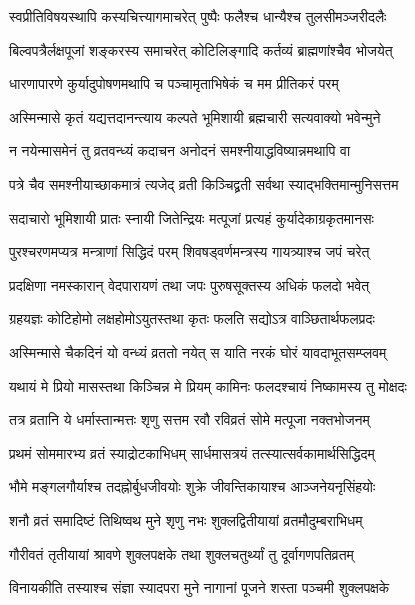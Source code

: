 \twolineshloka
{स्वप्रीतिविषयस्थापि कस्यचित्त्यागमाचरेत्}
{पुष्पैः फलैश्च धान्यैश्च तुलसीमञ्जरीदलैः} %

\twolineshloka
{बिल्वपत्रैर्लक्षपूजां शङ्करस्य समाचरेत्}
{कोटिलिङ्गादि कर्तव्यं ब्राह्मणांश्चैव भोजयेत्} %

\twolineshloka
{धारणापारणे कुर्यादुपोषणमथापि च}
{पञ्चामृताभिषेकं च मम प्रीतिकरं परम्} %

\twolineshloka
{अस्मिन्मासे कृतं यद्यत्तदानन्त्याय कल्पते}
{भूमिशायी ब्रह्मचारी सत्यवाक्यो भवेन्मुने} %

\twolineshloka
{न नयेन्मासमेनं तु व्रतवन्ध्यं कदाचन}
{अनोदनं समश्नीयाद्धविष्यान्नमथापि वा} %

\twolineshloka
{पत्रे चैव समश्नीयाच्छाकमात्रं त्यजेद् व्रती}
{किञ्चिद्व्रती सर्वथा स्याद्भक्तिमान्मुनिसत्तम} %

\twolineshloka
{सदाचारो भूमिशायी प्रातः स्नायी जितेन्द्रियः}
{मत्पूजां प्रत्यहं कुर्यादेकाग्रकृतमानसः} %

\twolineshloka
{पुरश्चरणमप्यत्र मन्त्राणां सिद्धिदं परम्}
{शिवषड्वर्णमन्त्रस्य गायत्र्याश्च जपं चरेत्} %

\twolineshloka
{प्रदक्षिणा नमस्कारान् वेदपारायणं तथा}
{जपः पुरुषसूक्तस्य अधिकं फलदो भवेत्} %

\twolineshloka
{ग्रहयज्ञः कोटिहोमो लक्षहोमोऽयुतस्तथा}
{कृतः फलति सद्योऽत्र वाञ्छितार्थफलप्रदः} %

\twolineshloka
{अस्मिन्मासे चैकदिनं यो वन्ध्यं व्रततो नयेत्}
{स याति नरकं घोरं यावदाभूतसम्प्लवम्} %

\twolineshloka
{यथायं मे प्रियो मासस्तथा किञ्चिन्न मे प्रियम्}
{कामिनः फलदश्चायं निष्कामस्य तु मोक्षदः} %

\twolineshloka
{तत्र व्रतानि ये धर्मास्तान्मत्तः शृणु सत्तम}
{रवौ रविव्रतं सोमे मत्पूजा नक्तभोजनम्} %

\twolineshloka
{प्रथमं सोममारभ्य व्रतं स्याद्रोटकाभिधम्}
{सार्धमासत्रयं तत्स्यात्सर्वकामार्थसिद्धिदम्} %

\twolineshloka
{भौमे मङ्गलगौर्याश्च तदह्नोर्बुधजीवयोः}
{शुक्रे जीवन्तिकायाश्च आञ्जनेयनृसिंहयोः} %

\twolineshloka
{शनौ व्रतं समादिष्टं तिथिष्वथ मुने शृणु}
{नभः शुक्लद्वितीयायां व्रतमौदुम्बराभिधम्} %

\twolineshloka
{गौरीवतं तृतीयायां श्रावणे शुक्लपक्षके}
{तथा शुक्लचतुर्थ्यां तु दूर्वागणपतिव्रतम्} %

\twolineshloka
{विनायकीति तस्याश्च संज्ञा स्यादपरा मुने}
{नागानां पूजने शस्ता पञ्चमी शुक्लपक्षके} %

